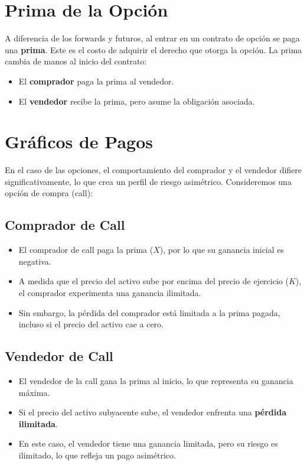 \documentclass{article}
\begin{document}
\section*{Prima de la Opción}

A diferencia de los forwards y futuros, al entrar en un contrato de opción se paga una \textbf{prima}. Este es el costo de adquirir el derecho que otorga la opción. La prima cambia de manos al inicio del contrato:

\begin{itemize}
    \item El \textbf{comprador} paga la prima al vendedor.
    \item El \textbf{vendedor} recibe la prima, pero asume la obligación asociada.
\end{itemize}

\section*{Gráficos de Pagos}

En el caso de las opciones, el comportamiento del comprador y el vendedor difiere significativamente, lo que crea un perfil de riesgo asimétrico. Consideremos una opción de compra (call):

\subsection*{Comprador de Call}

\begin{itemize}
    \item El comprador de call paga la prima ($X$), por lo que su ganancia inicial es negativa.
    \item A medida que el precio del activo sube por encima del precio de ejercicio ($K$), el comprador experimenta una ganancia ilimitada.
    \item Sin embargo, la pérdida del comprador está limitada a la prima pagada, incluso si el precio del activo cae a cero.
\end{itemize}

\subsection*{Vendedor de Call}

\begin{itemize}
    \item El vendedor de la call gana la prima al inicio, lo que representa su ganancia máxima.
    \item Si el precio del activo subyacente sube, el vendedor enfrenta una \textbf{pérdida ilimitada}.
    \item En este caso, el vendedor tiene una ganancia limitada, pero su riesgo es ilimitado, lo que refleja un pago asimétrico.
\end{itemize}
\end{document}
